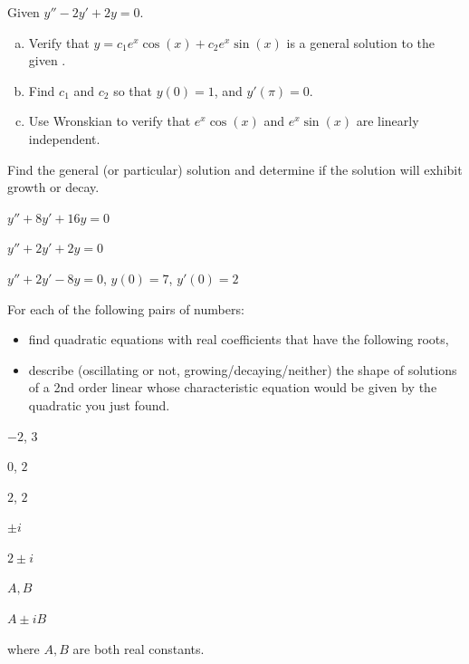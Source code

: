  \begin{question}
    Given $y''-2y'+2y = 0$.
    \begin{enumerate}[(a)]
      \item Verify that $y=c_1e^x\cos(x) + c_2 e^x\sin(x)$ is a general solution to the given \ode{}.
      \item Find $c_1$ and $c_2$ so that $y(0) = 1$, and $y'(\pi) = 0$.
      \item Use Wronskian to verify that $e^{x}\cos(x)$ and $e^{x}\sin(x) $ are linearly independent.
    \end{enumerate}
  \end{question}

  \begin{question}
    Find the general (or particular) solution and determine if the solution will exhibit growth or decay. 
    \begin{colenumerate}
      \item $y''+8y'+16y = 0$
      \item $y''+2y'+2y = 0$
      \item $y''+2y'-8y = 0$, $y(0) = 7$, $y'(0) = 2$
    \end{colenumerate}
  \end{question}

  \begin{question}
    For each of the following pairs of numbers:
    \begin{itemize}
      \item find quadratic equations with real coefficients that have the following roots,
      \item describe (oscillating or not, growing/decaying/neither) the shape of solutions of a 2nd order linear \ode{} whose
            characteristic equation would be given by the quadratic you just found.
    \end{itemize}
      \begin{colenumerate}[4]
        \item \(-2\), \(3\)
        \item \(0\), \(2\)
        \item \(2\), \(2\)
        \item \(\pm i\)
        \item \(2 \pm i\)
        \item \(A, B\)
        \item \(A \pm i B\)
      \end{colenumerate}
  where \(A, B\) are both real constants.
  \end{question}

